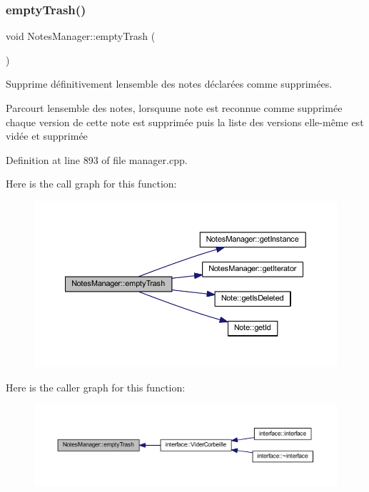 \subsubsection{\texorpdfstring{empty\+Trash()}{emptyTrash()}}
{\footnotesize\ttfamily void Notes\+Manager\+::empty\+Trash (\begin{DoxyParamCaption}{ }\end{DoxyParamCaption})}



Supprime définitivement l\textquotesingle{}ensemble des notes déclarées comme supprimées. 

Parcourt l\textquotesingle{}ensemble des notes, lorsqu\textquotesingle{}une note est reconnue comme supprimée chaque version de cette note est supprimée puis la liste des versions elle-\/même est vidée et supprimée 

Definition at line 893 of file manager.\+cpp.

Here is the call graph for this function\+:\nopagebreak
\begin{figure}[H]
\begin{center}
\leavevmode
\includegraphics[width=350pt]{class_notes_manager_a84e962ad7fa999cbb687fb43c1b3bab4_cgraph}
\end{center}
\end{figure}
Here is the caller graph for this function\+:\nopagebreak
\begin{figure}[H]
\begin{center}
\leavevmode
\includegraphics[width=350pt]{class_notes_manager_a84e962ad7fa999cbb687fb43c1b3bab4_icgraph}
\end{center}
\end{figure}
\mbox{\label{class_notes_manager_a566cbb0dd7b606ec34629a2aa8010b73}} 
